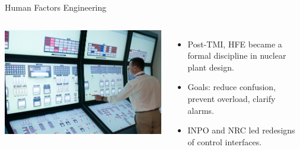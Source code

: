 \documentclass{beamer}
\begin{document}
\begin{frame}{Human Factors Engineering}
  \begin{columns}
  \includegraphics[width=\textwidth]{simulators.jpg}
  \begin{itemize}
    \item Post-TMI, HFE became a formal discipline in nuclear plant design.
    \item Goals: reduce confusion, prevent overload, clarify alarms.
    \item INPO and NRC led redesigns of control interfaces.
  \end{itemize}
\end{columns}
\end{frame}
\end{document}
